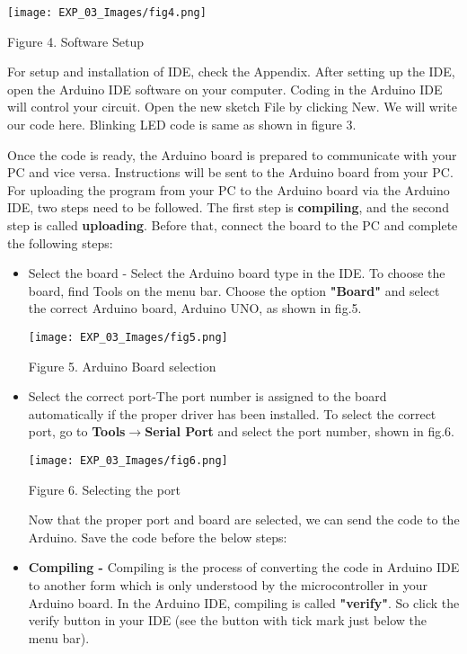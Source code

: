 \documentclass[12pt,a4paper]{article}
\begin{document}
\begin{justify}
    \begin{center} 
    \texttt{[image: EXP\_03\_Images/fig4.png]}
    \end{center}
    \begin{center} {Figure 4. Software Setup}\end{center}

\noindent For setup and installation of IDE, check the Appendix. After setting up the IDE, open the Arduino IDE software on your computer. Coding in the Arduino IDE will control your circuit. Open the new sketch File by clicking New. We will write our code here. Blinking LED code is same as shown in figure 3.\par

\noindent Once the code is ready, the Arduino board is prepared to communicate with your PC and vice versa. Instructions will be sent to the Arduino board from your PC. For uploading the program from your PC to the Arduino board via the Arduino IDE, two steps need to be followed. The first step is \textbf{compiling}, and the second step is called \textbf{uploading}. Before that, connect the board to the PC and complete the following steps:

\begin{itemize}
\setlength\itemsep{-0.3em}
\item Select the board - Select the Arduino board type in the IDE. To choose the board, find Tools on the menu bar. Choose the option \textbf{"Board"} and select the correct Arduino board, Arduino UNO, as shown in fig.5.
\begin{center} 
\texttt{[image: EXP\_03\_Images/fig5.png]}
\end{center}
\begin{center} {Figure 5. Arduino Board selection}\end{center}

\item Select the correct port-The port number is assigned to the board automatically if the proper driver has been installed. To select the correct port, go to \textbf{Tools$\rightarrow$Serial Port} and select the port number, shown in fig.6. 
\begin{center} 
\texttt{[image: EXP\_03\_Images/fig6.png]}
\end{center}
\begin{center} {Figure 6. Selecting the port}\end{center}
\noindent Now that the proper port and board are selected, we can send the code to the Arduino. Save the code before the below steps:\\
\item \textbf{Compiling - } Compiling is the process of converting the code in Arduino IDE to another form which is only understood by the microcontroller in your Arduino board. In the Arduino IDE, compiling is called \textbf{"verify"}. So click the verify button in your IDE (see the button with tick mark just below the menu bar).


\end{itemize}
\end{justify}
\end{document}

